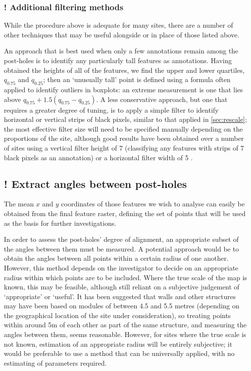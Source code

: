 \documentclass[../../ArchStats.tex]{subfiles}
\begin{document}
\subsubsection{! Additional filtering methods}
\label{sec:alternative-techniques}


While the procedure above is adequate for many sites, there are a number of other techniques that may be useful alongside or in place of those listed above. 

An approach that is best used when only a few annotations remain among the post-holes is to identify any particularly tall features as annotations. Having obtained the heights of all of the features, we find the upper and lower quartiles, $q_{0.75}$ and $q_{0.25}$; then an `unusually tall' point is defined using a formula often applied to identify outliers in boxplots: an extreme measurement is one that lies above $q_{0.75} + 1.5(q_{0.75} - q_{0.25})$. A less conservative approach, but one that requires a greater degree of tuning, is to apply a simple filter to identify horizontal or vertical strips of black pixels, similar to that applied in \ref{sec:rescale}; the most effective filter size will need to be specified manually depending on the proportions of the site, although good results have been obtained over a number of sites using a vertical filter height of 7 (classifying any features with strips of 7 black pixels as an annotation) or a horizontal filter width of 5 .


\subsection{! Extract angles between post-holes}
\label{sec:posts-to-angles}

The mean $x$ and $y$ coordinates of those features we wish to analyse can easily be obtained from the final feature raster, defining the set of points that will be used as the basis for further investigations.

In order to assess the post-holes' degree of alignment, an appropriate subset of the angles between them must be measured. A potential approach would be to obtain the angles between all points within a certain radius of one another. However, this method depends on the investigator to decide on an appropriate radius within which points are to be included. Where the true scale of the map is known, this may be feasible, although still  reliant on a subjective judgement of `appropriate' or `useful'. It has been suggested \cite{Kendall2014} that walls and other structures may have been based on modules of between 4.5 and 5.5 metres (depending on the geographical location of the site under consideration), so treating points within around 5m of each other as part of the same structure, and measuring the angles between them, seems reasonable. However, for sites where the true scale is not known, estimation of an appropriate radius will be entirely subjective; it would be preferable to use a method that can be universally applied, with no estimating of parameters required.
\end{document}
